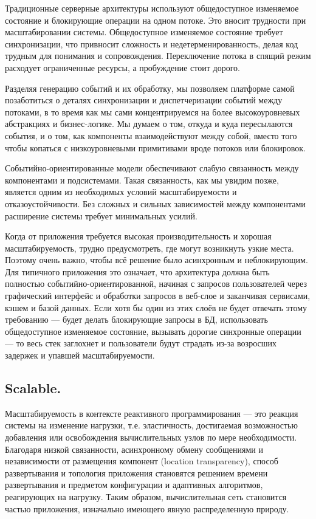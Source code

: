 Традиционные серверные архитектуры используют общедоступное изменяемое состояние и блокирующие операции на одном потоке. Это вносит трудности при масштабировании системы. Общедоступное изменяемое состояние требует синхронизации, что привносит сложность и недетерменированность, делая код трудным для понимания и сопровождения. Переключение потока в спящий режим расходует ограниченные ресурсы, а пробуждение стоит дорого.

Разделяя генерацию событий и их обработку, мы позволяем платформе самой позаботиться о деталях синхронизации и диспетчеризации событий между потоками, в то время как мы сами концентрируемся на более высокоуровневых абстракциях и бизнес-логике. Мы думаем о том, откуда и куда пересылаются события, и о том, как компоненты взаимодействуют между собой, вместо того чтобы копаться с низкоуровневыми примитивами вроде потоков или блокировок.

Событийно-ориентированные модели обеспечивают слабую связанность между компонентами и подсистемами. Такая связанность, как мы увидим позже, является одним из необходимых условий масштабируемости и отказоустойчивости. Без сложных и сильных зависимостей между компонентами расширение системы требует минимальных усилий.

Когда от приложения требуется высокая производительность и хорошая масштабируемость, трудно предусмотреть, где могут возникнуть узкие места. Поэтому очень важно, чтобы всё решение было асинхронным и неблокирующим. Для типичного приложения это означает, что архитектура должна быть полностью событийно-ориентированной, начиная с запросов пользователей через графический интерфейс и обработки запросов в веб-слое и заканчивая сервисами, кэшем и базой данных. Если хотя бы один из этих слоёв не будет отвечать этому требованию --- будет делать блокирующие запросы в БД, использовать общедоступное изменяемое состояние, вызывать дорогие синхронные операции --- то весь стек заглохнет и пользователи будут страдать из-за возросших задержек и упавшей масштабируемости.

\subsection{Scalable. }
\label{subsub:domain:reactive_programming:scalable}

Масштабируемость в контексте реактивного программирования --- это реакция системы на изменение нагрузки, т.е. эластичность, достигаемая возможностью добавления или освобождения вычислительных узлов по мере необходимости. Благодаря низкой связанности, асинхронному обмену сообщениями и независимости от размещения компонент (location transparency), способ развертывания и топология приложения становятся решением времени развертывания и предметом конфигурации и адаптивных алгоритмов, реагирующих на нагрузку. Таким образом, вычислительная сеть становится частью приложения, изначально имеющего явную распределенную природу.

